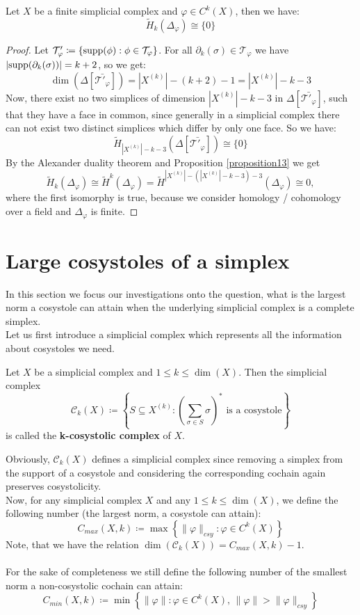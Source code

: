 \begin{thm}
Let \(X\) be a finite simplicial complex and \(\varphi\in C^k(X)\), then we have:
\[
\tilde{H}_k(\Delta_{\varphi})\cong\{0\}
\]
\begin{proof}
Let \(\mathcal{T}'_{\varphi}\coloneqq\{\mathrm{supp}(\phi):\phi\in\mathcal{T}_{\varphi}\}\). For all \(\partial_k(\sigma)\in\mathcal{T}_{\varphi}\) we have \(|\mathrm{supp}(\partial_k(\sigma))|=k+2\), so we get:
\[
\dim(\Delta[\bar{\mathcal{T}'_{\varphi}}])=|X^{(k)}|-(k+2)-1=|X^{(k)}|-k-3
\]
Now, there exist no two simplices of dimension \(|X^{(k)}|-k-3\) in \(\Delta[\bar{\mathcal{T}'_{\varphi}}]\), such that they have a face in common, since generally in a simplicial complex there can not exist two distinct simplices which differ by only one face. So we have:
\[
\tilde{H}_{|X^{(k)}|-k-3}(\Delta[\bar{\mathcal{T}'_{\varphi}}])\cong\{0\}
\]
By the Alexander duality theorem and Proposition \ref{proposition13} we get
\[
\tilde{H}_k(\Delta_{\varphi})\cong\tilde{H}^k(\Delta_{\varphi})=\tilde{H}^{|X^{(k)}|-(|X^{(k)}|-k-3)-3}(\Delta_{\varphi})\cong 0,
\]
where the first isomorphy is true, because we consider homology / cohomology over a field and \(\Delta_{\varphi}\) is finite.
\end{proof}
\end{thm}

\newpage

\section{Large cosystoles of a simplex}

In this section we focus our investigations onto the question, what is the largest norm a cosystole can attain when the underlying simplicial complex is a complete simplex.\\
Let us first introduce a simplicial complex which represents all the information about cosystoles we need.

\begin{defi}
Let \(X\) be a simplicial complex and \(1\leq k\leq \dim(X)\). Then the simplicial complex
\[
\mathcal{C}_k(X)\coloneqq \left\{S\subseteq X^{(k)}:\left(\sum\limits_{\sigma\in S}\sigma\right)^*\text{ is a cosystole}\right\}
\]
is called the \textbf{k-cosystolic complex} of \(X\).
\end{defi}

Obviously, \(\mathcal{C}_k(X)\) defines a simplicial complex since removing a simplex from the support of a cosystole and considering the corresponding cochain again preserves cosystolicity.\\
Now, for any simplicial complex \(X\) and any \(1\leq k\leq \dim(X)\), we define the following number (the largest norm, a cosystole can attain):
\[
C_{max}(X,k)\coloneqq \max\left\{\|\varphi\|_{csy}:\varphi\in C^k(X)\right\}
\]
Note, that we have the relation \(\dim(\mathcal{C}_k(X))=C_{max}(X,k)-1\).\\
\\
For the sake of completeness we still define the following number of the smallest norm a non-cosystolic cochain can attain:
\[
C_{min}(X,k)\coloneqq \min\left\{\|\varphi\|:\varphi\in C^k(X)\text{, }\|\varphi\|>\|\varphi\|_{csy}\right\}
\]

